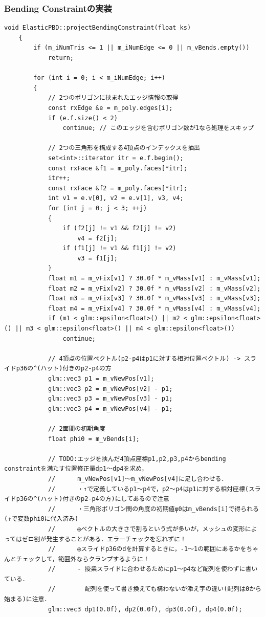 \documentclass[a4paper,10pt,uplatex,dvipdfmx]{jsarticle}
\begin{document}
\subsubsection{Bending Constraintの実装}
\begin{lstlisting}[caption=pbd.cppのprojectBendingConstraint関数]
	void ElasticPBD::projectBendingConstraint(float ks)
	{
		if (m_iNumTris <= 1 || m_iNumEdge <= 0 || m_vBends.empty())
			return;
	
		for (int i = 0; i < m_iNumEdge; i++)
		{
			// 2つのポリゴンに挟まれたエッジ情報の取得
			const rxEdge &e = m_poly.edges[i];
			if (e.f.size() < 2)
				continue; // このエッジを含むポリゴン数が1なら処理をスキップ
	
			// 2つの三角形を構成する4頂点のインデックスを抽出
			set<int>::iterator itr = e.f.begin();
			const rxFace &f1 = m_poly.faces[*itr];
			itr++;
			const rxFace &f2 = m_poly.faces[*itr];
			int v1 = e.v[0], v2 = e.v[1], v3, v4;
			for (int j = 0; j < 3; ++j)
			{
				if (f2[j] != v1 && f2[j] != v2)
					v4 = f2[j];
				if (f1[j] != v1 && f1[j] != v2)
					v3 = f1[j];
			}
			float m1 = m_vFix[v1] ? 30.0f * m_vMass[v1] : m_vMass[v1];
			float m2 = m_vFix[v2] ? 30.0f * m_vMass[v2] : m_vMass[v2];
			float m3 = m_vFix[v3] ? 30.0f * m_vMass[v3] : m_vMass[v3];
			float m4 = m_vFix[v4] ? 30.0f * m_vMass[v4] : m_vMass[v4];
			if (m1 < glm::epsilon<float>() || m2 < glm::epsilon<float>() || m3 < glm::epsilon<float>() || m4 < glm::epsilon<float>())
				continue;
	
			// 4頂点の位置ベクトル(p2-p4はp1に対する相対位置ベクトル) -> スライドp36の^(ハット)付きのp2-p4の方
			glm::vec3 p1 = m_vNewPos[v1];
			glm::vec3 p2 = m_vNewPos[v2] - p1;
			glm::vec3 p3 = m_vNewPos[v3] - p1;
			glm::vec3 p4 = m_vNewPos[v4] - p1;
	
			// 2面間の初期角度
			float phi0 = m_vBends[i];
	
			// TODO:エッジを挟んだ4頂点座標p1,p2,p3,p4からbending constraintを満たす位置修正量dp1～dp4を求め，
			//      m_vNewPos[v1]～m_vNewPos[v4]に足し合わせる．
			//		・↑で定義しているp1～p4で，p2～p4はp1に対する相対座標(スライドp36の^(ハット)付きのp2-p4の方)にしてあるので注意
			//		・三角形ポリゴン間の角度の初期値φ0はm_vBends[i]で得られる(↑で変数phi0に代入済み)
			//      ◎ベクトルの大きさで割るという式が多いが，メッシュの変形によってはゼロ割が発生することがある．エラーチェックを忘れずに！
			//		◎スライドp36のdを計算するときに，-1～1の範囲にあるかをちゃんとチェックして，範囲外ならクランプするように！
			//      - 授業スライドに合わせるためにp1～p4など配列を使わずに書いている．
			//		  配列を使って書き換えても構わないが添え字の違い(配列は0から始まる)に注意．
			glm::vec3 dp1(0.0f), dp2(0.0f), dp3(0.0f), dp4(0.0f);
	

\end{lstlisting}
\end{document}
